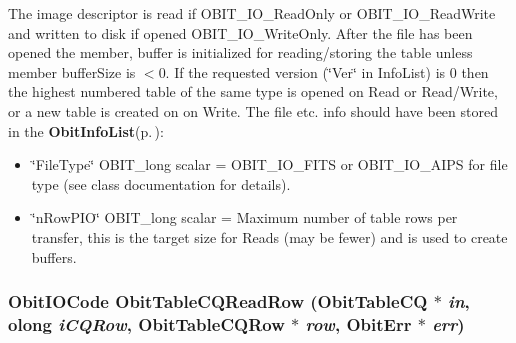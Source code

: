 The image descriptor is read if OBIT\_\-IO\_\-Read\-Only or OBIT\_\-IO\_\-Read\-Write and written to disk if opened OBIT\_\-IO\_\-Write\-Only. After the file has been opened the member, buffer is initialized for reading/storing the table unless member buffer\-Size is $<$0. If the requested version (\char`\"{}Ver\char`\"{} in Info\-List) is 0 then the highest numbered table of the same type is opened on Read or Read/Write, or a new table is created on on Write. The file etc. info should have been stored in the {\bf Obit\-Info\-List}{\rm (p.\,\pageref{structObitInfoList})}: \begin{itemize}
\item \char`\"{}File\-Type\char`\"{} OBIT\_\-long scalar = OBIT\_\-IO\_\-FITS or OBIT\_\-IO\_\-AIPS for file type (see class documentation for details). \item \char`\"{}n\-Row\-PIO\char`\"{} OBIT\_\-long scalar = Maximum number of table rows per transfer, this is the target size for Reads (may be fewer) and is used to create buffers. 
\end{itemize}
\subsubsection{\setlength{\rightskip}{0pt plus 5cm}Obit\-IOCode Obit\-Table\-CQRead\-Row ({\bf Obit\-Table\-CQ} $\ast$ {\em in}, {\bf olong} {\em i\-CQRow}, {\bf Obit\-Table\-CQRow} $\ast$ {\em row}, {\bf Obit\-Err} $\ast$ {\em err})}\label{ObitTableCQ_8h_a18}


